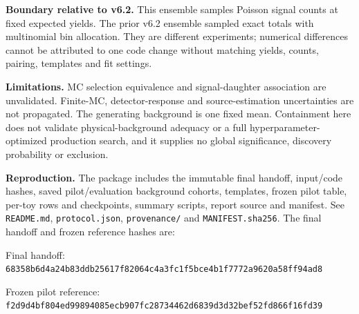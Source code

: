 \documentclass[10pt]{article}
\begin{document}
\par\textbf{Boundary relative to v6.2.} This ensemble samples Poisson signal counts at fixed expected yields. The prior v6.2 ensemble sampled exact totals with multinomial bin allocation. They are different experiments; numerical differences cannot be attributed to one code change without matching yields, counts, pairing, templates and fit settings.
\par\textbf{Limitations.} MC selection equivalence and signal-daughter association are unvalidated. Finite-MC, detector-response and source-estimation uncertainties are not propagated. The generating background is one fixed mean. Containment here does not validate physical-background adequacy or a full hyperparameter-optimized production search, and it supplies no global significance, discovery probability or exclusion.
\par\textbf{Reproduction.} The package includes the immutable final handoff, input/code hashes, saved pilot/evaluation background cohorts, templates, frozen pilot table, per-toy rows and checkpoints, summary scripts, report source and manifest. See \texttt{README.md}, \texttt{protocol.json}, \texttt{provenance/} and \texttt{MANIFEST.sha256}. The final handoff and frozen reference hashes are:
{\small Final handoff: \texttt{68358b6d4a24b83ddb25617f82064c4a3fc1f5bce4b1f7772a9620a58ff94ad8}\par}
{\small Frozen pilot reference: \texttt{f2d9d4bf804ed99894085ecb907fc28734462d6839d3d32bef52fd866f16fd39}\par}
\end{document}
